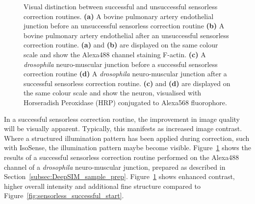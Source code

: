 \begin{figure}[h]
\begin{subfigure}{0.48\textwidth}
		\caption{}
		\label{fig:sensorless_successful_end}
	\end{subfigure}
	\caption[Visual distinction between unsuccessful and
          successful sensorless correction routines]{Visual
          distinction between successful and unsuccessful sensorless
          correction routines. \textbf{(a)} A bovine pulmonary artery
          endothelial junction before an unsuccessful sensorless
          correction routine \textbf{(b)} A bovine pulmonary artery
          endothelial after an unsuccessful sensorless correction
          routine. \textbf{(a)} and \textbf{(b)} are displayed on the
          same colour scale and show the Alexa488 channel staining
          F-actin. \textbf{(c)} A \textit{drosophila} neuro-muscular
          junction before a successful sensorless correction routine
          \textbf{(d)} A \textit{drosophila} neuro-muscular junction
          after a successful sensorless correction
          routine. \textbf{(c)} and \textbf{(d)} are displayed on the
          same colour scale and show the neuron, visualised with Horseradish 
          Peroxidase (HRP) conjugated to Alexa568 fluorophore.}
	\label{fig:sensorless_routine_success_failure}
\end{figure}

In a successful sensorless correction routine, the improvement in image 
quality will be visually apparent. Typically, this manifests as increased 
image contrast. Where a structured illumination pattern has been applied 
during correction, such with IsoSense, the illumination pattern maybe become 
visible. Figure~\ref{fig:sensorless_successful_end} shows the results of a 
successful sensorless correction routine performed on the Alexa488 channel of 
a \textit{drosophila} neuro-muscular junction, prepared as described in 
Section~\ref{subsec:DeepSIM_sample_prep}. 
Figure~\ref{fig:sensorless_successful_end} shows enhanced contrast, higher 
overall intensity and additional fine structure compared to 
Figure~\ref{fig:sensorless_successful_start}.
